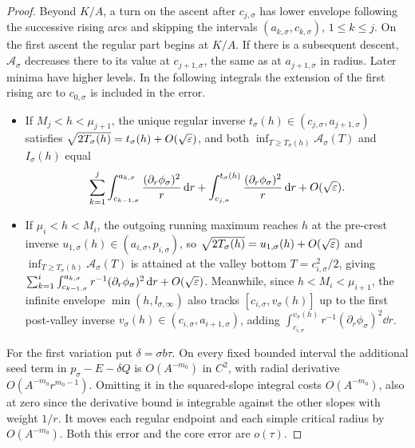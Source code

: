 \begin{proof}
Beyond $K/A$, a turn on the ascent after $c_{j,\sigma}$ has lower
envelope following the successive rising arcs and skipping the
intervals $(a_{k,\sigma},c_{k,\sigma})$, $1\le k\le j$. On the first
ascent the regular part begins at $K/A$. If there is a subsequent
descent, $\mathcal A_\sigma$ decreases there to its value at
$c_{j+1,\sigma}$, the same as at $a_{j+1,\sigma}$ in radius. Later
minima have higher levels. In the following integrals the extension
of the first rising arc to $c_{0,\sigma}$ is included in the error.
\begin{itemize}
  \item If $M_j<h<\mu_{j+1}$, the unique regular inverse $t_\sigma(h)\in(c_{j,\sigma},a_{j+1,\sigma})$
  satisfies $\sqrt{2T_\sigma(h)}=t_\sigma(h)+O(\sqrt{\varepsilon})$, and both $\inf_{T\ge
  T_\sigma(h)}\mathcal{A}_\sigma(T)$ and $I_\sigma(h)$ equal
  \[
    \sum_{k=1}^j \int_{c_{k-1,\sigma}}^{a_{k,\sigma}} \frac{(\partial_r\phi_\sigma)^2}{r}\,\mathrm{d} r +
    \int_{c_{j,\sigma}}^{t_\sigma(h)} \frac{(\partial_r\phi_\sigma)^2}{r}\,\mathrm{d} r + O(\sqrt{\varepsilon}).
  \]
  \item If $\mu_i<h<M_i$, the outgoing running maximum reaches $h$ at the pre-crest inverse
  $u_{1,\sigma}(h)\in(a_{i,\sigma},p_{i,\sigma})$, so
  $\sqrt{2T_\sigma(h)}=u_{1,\sigma}(h)+O(\sqrt{\varepsilon})$ and $\inf_{T\ge
  T_\sigma(h)}\mathcal{A}_\sigma(T)$ is attained at the valley bottom $T=c_{i,\sigma}^2/2$, giving
  $\sum_{k=1}^i \int_{c_{k-1,\sigma}}^{a_{k,\sigma}} r^{-1}(\partial_r\phi_\sigma)^2\,\mathrm{d} r +
  O(\sqrt{\varepsilon})$. Meanwhile, since $h<M_i<\mu_{i+1}$, the infinite envelope $\min(h,l_{\sigma,\infty})$
  also tracks $[c_{i,\sigma},v_\sigma(h)]$ up to the first post-valley inverse
  $v_\sigma(h)\in(c_{i,\sigma},a_{i+1,\sigma})$, adding
  $\int_{c_{i,\sigma}}^{v_\sigma(h)}r^{-1}(\partial_r\phi_\sigma)^2\dd r$.
\end{itemize}
For the first variation put $\delta=\sigma b\tau$. On every fixed
bounded interval the additional seed term in $p_\sigma-E-\delta Q$
is $O(A^{-m_0})$ in $C^2$, with radial derivative
$O(A^{-m_0}r^{m_0-1})$. Omitting it in the squared-slope integral
costs $O(A^{-m_0})$, also at zero since the derivative bound is
integrable against the other slopes with weight $1/r$. It moves each
regular endpoint and each simple critical radius by $O(A^{-m_0})$.
Both this error and the core error are $o(\tau)$.


\end{proof}
